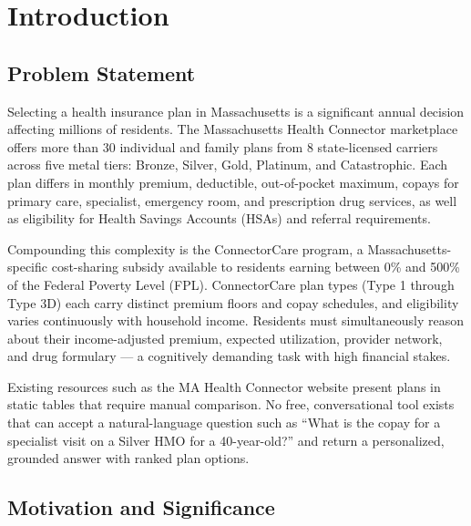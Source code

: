 \documentclass[12pt, letterpaper]{article}
\begin{document}
\newpage
\tableofcontents
\listoffigures
\listoftables
\newpage

\section{Introduction}

\subsection{Problem Statement}

Selecting a health insurance plan in Massachusetts is a significant annual decision affecting millions of residents. The Massachusetts Health Connector marketplace offers more than 30 individual and family plans from 8 state-licensed carriers across five metal tiers: Bronze, Silver, Gold, Platinum, and Catastrophic. Each plan differs in monthly premium, deductible, out-of-pocket maximum, copays for primary care, specialist, emergency room, and prescription drug services, as well as eligibility for Health Savings Accounts (HSAs) and referral requirements.

Compounding this complexity is the ConnectorCare program, a Massachusetts-specific cost-sharing subsidy available to residents earning between 0\% and 500\% of the Federal Poverty Level (FPL). ConnectorCare plan types (Type 1 through Type 3D) each carry distinct premium floors and copay schedules, and eligibility varies continuously with household income. Residents must simultaneously reason about their income-adjusted premium, expected utilization, provider network, and drug formulary --- a cognitively demanding task with high financial stakes.

Existing resources such as the MA Health Connector website present plans in static tables that require manual comparison. No free, conversational tool exists that can accept a natural-language question such as ``What is the copay for a specialist visit on a Silver HMO for a 40-year-old?'' and return a personalized, grounded answer with ranked plan options.

\subsection{Motivation and Significance}
\end{document}
